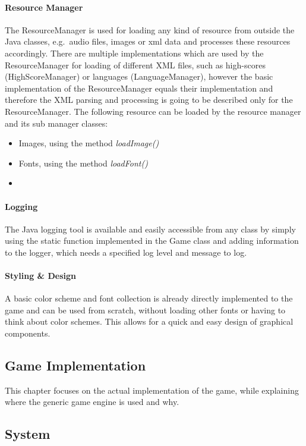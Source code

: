 \paragraph{Resource Manager}
The ResourceManager is used for loading any kind of resource from outside the Java classes, e.g.\ audio files, images or xml data and processes
these resources accordingly.
There are multiple implementations which are used by the ResourceManager for loading of different XML files, such as high-scores (HighScoreManager) or languages (LanguageManager),
however the basic implementation of the ResourceManager equals their implementation and therefore the XML parsing and processing is going to be described only for the ResourceManager.
The following resource can be loaded by the resource manager and its sub manager classes:
\begin{itemize}
    \item Images, using the method \textit{loadImage()}
    \item Fonts, using the method \textit{loadFont()}
    \item
\end{itemize}
\paragraph{Logging}
The Java logging tool is available and easily accessible from any class by simply using the static function implemented in the Game class and adding information to
the logger, which needs a specified log level and message to log.

\paragraph{Styling \& Design}
A basic color scheme and font collection is already directly implemented to the game and can be used from scratch, without loading other fonts or having to think about
color schemes.
This allows for a quick and easy design of graphical components.

\subsection{Game Implementation}\label{subsec:game-implementation}
This chapter focuses on the actual implementation of the game, while explaining where the generic game engine is used and why.

\subsection{System}\label{subsec:system}
